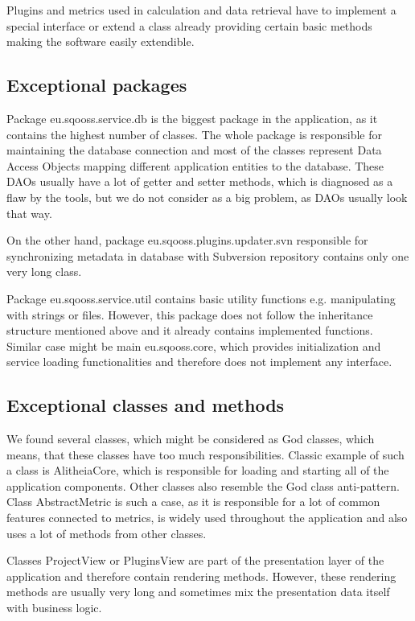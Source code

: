 \documentclass[a4paper,11pt,titlepage]{article}
\begin{document}
Plugins and metrics used in calculation and data retrieval have to implement a special interface or extend a class already providing certain basic methods making the software easily extendible.

\subsection{Exceptional packages}
Package eu.sqooss.service.db is the biggest package in the application, as it contains the highest number of classes. The whole package is responsible for maintaining the database connection and most of the classes represent Data Access Objects mapping different application entities to the database. These DAOs usually have a lot of getter and setter methods, which is diagnosed as a flaw by the tools, but we do not consider as a big problem, as DAOs usually look that way.

On the other hand, package eu.sqooss.plugins.updater.svn responsible for synchronizing metadata in database with Subversion repository contains only one very long class.

Package eu.sqooss.service.util contains basic utility functions e.g. manipulating with strings or files. However, this package does not follow the inheritance structure mentioned above and it already contains implemented functions. Similar case might be main eu.sqooss.core, which provides initialization and service loading functionalities and therefore does not implement any interface.

\subsection{Exceptional classes and methods}
We found several classes, which might be considered as God classes, which means, that these classes have too much responsibilities. Classic example of such a class is AlitheiaCore, which is responsible for loading and starting all of the application components. Other classes also resemble the God class anti-pattern. Class AbstractMetric is such a case, as it is responsible for a lot of common features connected to metrics, is widely used throughout the application and also uses a lot of methods from other classes.

Classes ProjectView or PluginsView are part of the presentation layer of the application and therefore contain rendering methods. However, these rendering methods are usually very long and sometimes mix the presentation data itself with business logic.
\end{document}
